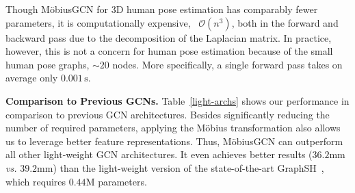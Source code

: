 \documentclass[runningheads]{llncs}
\begin{document}
Though M\"obiusGCN for 3D human pose estimation has comparably fewer parameters, it is computationally expensive, \ie~$\mathcal{O}(n^3)$, both in the forward and backward pass due to the decomposition of the Laplacian matrix. In practice, however, this is not a concern for human pose estimation because of the small human pose graphs, \ie$\sim20$ nodes. 
More specifically, a single forward pass takes on average only $0.001\,\text{s}$.\begin{center}
\label{light-archs}
 \end{center}
\textbf{Comparison to Previous GCNs.}
Table~\ref{light-archs} shows our performance in comparison to previous GCN architectures.
Besides significantly reducing the number of required parameters, applying the M\"obius transformation also allows us to leverage better feature representations.
Thus, M\"obiusGCN can outperform all other light-weight GCN architectures.
It even achieves better results ($36.2\text{mm}$ \emph{vs.} $39.2\text{mm}$) than the light-weight version of the state-of-the-art GraphSH~\cite{xu2021graph}, which requires $0.44\text{M}$ parameters. 
\end{document}
